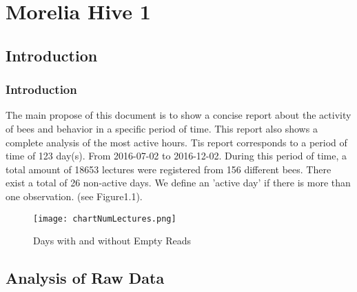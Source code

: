 \documentclass[11pt,fleqn]{book} %
\begin{document}


\pagestyle{empty} %

\tableofcontents %


\pagestyle{fancy} %

\part{Morelia Hive 1}
\chapter{Introduction} 
\normalsize%
\section*{Introduction}%
The main propose of this document  is to show a concise report about the activity of bees and behavior in a specific period of time. This report also shows a complete analysis of the most active hours.\newline%
\newline%
Tis report corresponds to a period of time of 123 day(s). From 2016{-}07{-}02 to 2016{-}12{-}02. During this period of time, a total amount of 18653 lectures were registered from 156 different bees. There exist a total of 26 non{-}active days. We define an 'active day' if there is more than one observation. (see Figure1.1).\newline%
\newline%
%


\begin{figure}[h!]%
\centering%
\texttt{[image: chartNumLectures.png]}%
\caption{Days with and without Empty Reads}%
\end{figure}

\chapter{Analysis of Raw Data} 
\normalsize%
\end{document}
